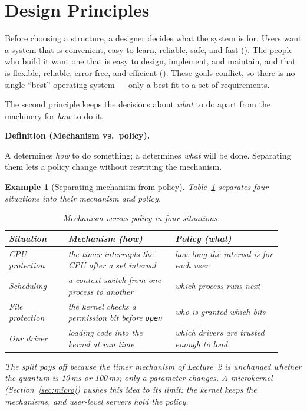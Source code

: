 \documentclass[11pt]{article}
\newtheorem{example}{Example}
\newenvironment{definitionbox}[1]{%
  \par\noindent\textbf{Definition (#1).}\ \itshape
}{\par\vspace{0.3em}}
\begin{document}
\section{Design Principles}

\noindent{}

Before choosing a structure, a designer decides what the system is for. Users
want a system that is convenient, easy to learn, reliable, safe, and fast
(). The people who build it want one that is easy to design,
implement, and maintain, and that is flexible, reliable, error-free, and
efficient (). These goals conflict, so there is no single
``best'' operating system --- only a best fit to a set of requirements.

The second principle keeps the decisions about \emph{what} to do apart from the
machinery for \emph{how} to do it.

\begin{definitionbox}{Mechanism vs.\ policy}
A  determines \emph{how} to do something; a 
determines \emph{what} will be done. Separating them lets a policy change
without rewriting the mechanism.
\end{definitionbox}

\begin{example}[Separating mechanism from policy]
Table~\ref{tab:mechpol} separates four situations into their mechanism and
policy.
\begin{table}[h]
\centering
\small
\renewcommand{\arraystretch}{1.3}
\begin{tabular}{@{}>{\raggedright\arraybackslash}p{0.20\linewidth}>{\raggedright\arraybackslash}p{0.36\linewidth}>{\raggedright\arraybackslash}p{0.36\linewidth}@{}}
\toprule
\textbf{Situation} & \textbf{Mechanism (how)} & \textbf{Policy (what)} \\
\midrule
CPU protection & the timer interrupts the CPU after a set interval & how long the interval is for each user \\
Scheduling & a context switch from one process to another & which process runs next \\
File protection & the kernel checks a permission bit before \texttt{open} & who is granted which bits \\
Our driver & loading code into the kernel at run time & which drivers are trusted enough to load \\
\bottomrule
\end{tabular}
\caption{Mechanism versus policy in four situations.}
\label{tab:mechpol}
\end{table}
The split pays off because the timer mechanism of Lecture~2 is unchanged whether
the quantum is 10\,ms or 100\,ms; only a parameter changes. A microkernel
(Section~\ref{sec:micro}) pushes this idea to its limit: the kernel keeps the
mechanisms, and user-level servers hold the policy.
\end{example}
\end{document}
